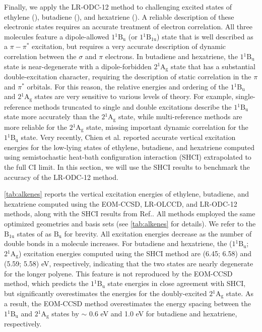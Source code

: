 Finally, we apply the LR-ODC-12 method to challenging excited states of ethylene
(), butadiene (), and hexatriene ().
A reliable description of these electronic states requires an accurate treatment
of electron correlation.
\cite{Tavan:1986p6602,
Tavan:1987p4337,
Nakayama:1998p157,
Davidson:1996p6161,
Watts:1998p6979,
Muller:1999p7176,
Li:1999p177,
Starcke:2006p39,
Kurashige:2004p425,
Ghosh:2008p144117,
Sokolov:2017p244102,
Schreiber:2008p134110,
Zgid:2009p194107,
Angeli:2010p2436,
Daday:2012p4441,
Watson:2012p4013,
Zimmerman:2017p4712} 
All three molecules feature a dipole-allowed $1{}^1\mathrm{B_{u}}$ (or $1{}^1\mathrm{B_{1u}}$) state that is well described as a $\pi-\pi^*$ excitation, but requires a very accurate description of dynamic correlation between the $\sigma$ and $\pi$ electrons. In butadiene and hexatriene, the $1{}^1\mathrm{B_{u}}$ state is near-degenerate with a dipole-forbidden $2{}^1\mathrm{A_{g}}$ state that has a substantial double-excitation character, requiring the description of static correlation in the $\pi$ and $\pi^*$ orbitals.\cite{Kurashige:2004p425,Ghosh:2008p144117,Sokolov:2017p244102} For this reason, the relative energies and ordering of the $1{}^1\mathrm{B_{u}}$ and $2{}^1\mathrm{A_{g}}$ states are very sensitive to various levels of theory. For example, single-reference methods truncated to single and double excitations describe the $1{}^1\mathrm{B_{u}}$ state more accurately than the $2{}^1\mathrm{A_{g}}$ state, while multi-reference methods are more reliable for the $2{}^1\mathrm{A_{g}}$ state, missing important dynamic correlation for the $1{}^1\mathrm{B_{u}}$ state. Very recently, Chien et al.\cite{Chien:2018p2714} reported accurate vertical excitation energies for the low-lying states of ethylene, butadiene, and hexatriene computed using semistochastic heat-bath configuration interaction (SHCI) extrapolated to the full CI limit. In this section, we will use the SHCI results to benchmark the accuracy of the LR-ODC-12 method.

\cref{tab:alkenes} reports the vertical excitation energies of ethylene, butadiene, and hexatriene computed using the EOM-CCSD, LR-OLCCD, and LR-ODC-12 methods, along with the SHCI results from Ref.\@ {}. All methods employed the same optimized geometries and basis sets (see \cref{tab:alkenes} for details). We refer to the $\mathrm{B_{1u}}$ states of  as $\mathrm{B_{u}}$ for brevity. All excitation energies decrease as the number of double bonds in a molecule increases. For butadiene and hexatriene, the ($1{}^1\mathrm{B_{u}}$; $2{}^1\mathrm{A_{g}}$) excitation energies computed using the SHCI method are (6.45; 6.58) and (5.59; 5.58) eV, respectively, indicating that the two states are nearly degenerate for the longer polyene. This feature is not reproduced by the EOM-CCSD method, which predicts the $1{}^1\mathrm{B_{u}}$ state energies in close agreement with SHCI, but significantly overestimates the energies for the doubly-excited $2{}^1\mathrm{A_{g}}$ state. As a result, the EOM-CCSD method overestimates the energy spacing between the $1{}^1\mathrm{B_{u}}$ and $2{}^1\mathrm{A_{g}}$ states by $\sim$ 0.6 eV and 1.0 eV for butadiene and hexatriene, respectively. 

